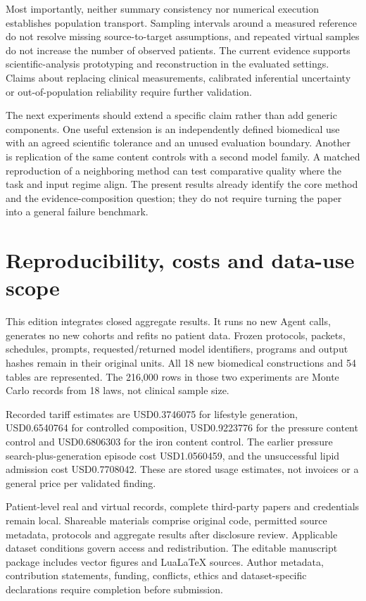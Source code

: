 \documentclass[11pt,letterpaper]{article}
\begin{document}
Most importantly, neither summary consistency nor numerical execution establishes population transport. Sampling intervals around a measured reference do not resolve missing source-to-target assumptions, and repeated virtual samples do not increase the number of observed patients. The current evidence supports scientific-analysis prototyping and reconstruction in the evaluated settings. Claims about replacing clinical measurements, calibrated inferential uncertainty or out-of-population reliability require further validation.


The next experiments should extend a specific claim rather than add generic components. One useful extension is an independently defined biomedical use with an agreed scientific tolerance and an unused evaluation boundary. Another is replication of the same content controls with a second model family. A matched reproduction of a neighboring method can test comparative quality where the task and input regime align. The present results already identify the core method and the evidence-composition question; they do not require turning the paper into a general failure benchmark.



\section{Reproducibility, costs and data-use scope}

This edition integrates closed aggregate results. It runs no new Agent calls, generates no new cohorts and refits no patient data. Frozen protocols, packets, schedules, prompts, requested/\allowbreak{}returned model identifiers, programs and output hashes remain in their original units. All 18 new biomedical constructions and 54 tables are represented. The 216,000 rows in those two experiments are Monte Carlo records from 18 laws, not clinical sample size.


Recorded tariff estimates are USD0.3746075 for lifestyle generation, USD0.6540764 for controlled composition, USD0.9223776 for the pressure content control and USD0.6806303 for the iron content control. The earlier pressure search-plus-generation episode cost USD1.0560459, and the unsuccessful lipid admission cost USD0.7708042. These are stored usage estimates, not invoices or a general price per validated finding.


Patient-level real and virtual records, complete third-party papers and credentials remain local. Shareable materials comprise original code, permitted source metadata, protocols and aggregate results after disclosure review. Applicable dataset conditions govern access and redistribution. The editable manuscript package includes vector figures and LuaLaTeX sources. Author metadata, contribution statements, funding, conflicts, ethics and dataset-specific declarations require completion before submission.
\end{document}
